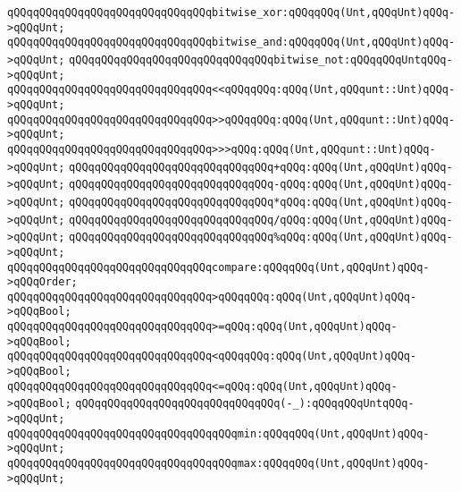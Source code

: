 \verb|qQQqqQQqqQQqqQQqqQQqqQQqqQQqqQQqbitwise_xor:qQQqqQQq(Unt,qQQqUnt)qQQq->qQQqUnt;|\newline
\verb|qQQqqQQqqQQqqQQqqQQqqQQqqQQqqQQqbitwise_and:qQQqqQQq(Unt,qQQqUnt)qQQq->qQQqUnt;|\newline
\verb|qQQqqQQqqQQqqQQqqQQqqQQqqQQqqQQqbitwise_not:qQQqqQQqUntqQQq->qQQqUnt;|\newline
\newline
\verb|qQQqqQQqqQQqqQQqqQQqqQQqqQQqqQQq<<qQQqqQQq:qQQq(Unt,qQQqunt::Unt)qQQq->qQQqUnt;|\newline
\verb|qQQqqQQqqQQqqQQqqQQqqQQqqQQqqQQq>>qQQqqQQq:qQQq(Unt,qQQqunt::Unt)qQQq->qQQqUnt;|\newline
\verb|qQQqqQQqqQQqqQQqqQQqqQQqqQQqqQQq>>>qQQq:qQQq(Unt,qQQqunt::Unt)qQQq->qQQqUnt;|\newline
\newline
\verb|qQQqqQQqqQQqqQQqqQQqqQQqqQQqqQQq+qQQq:qQQq(Unt,qQQqUnt)qQQq->qQQqUnt;|\newline
\verb|qQQqqQQqqQQqqQQqqQQqqQQqqQQqqQQq-qQQq:qQQq(Unt,qQQqUnt)qQQq->qQQqUnt;|\newline
\verb|qQQqqQQqqQQqqQQqqQQqqQQqqQQqqQQq*qQQq:qQQq(Unt,qQQqUnt)qQQq->qQQqUnt;|\newline
\verb|qQQqqQQqqQQqqQQqqQQqqQQqqQQqqQQq/qQQq:qQQq(Unt,qQQqUnt)qQQq->qQQqUnt;|\newline
\verb|qQQqqQQqqQQqqQQqqQQqqQQqqQQqqQQq%qQQq:qQQq(Unt,qQQqUnt)qQQq->qQQqUnt;|\newline
\newline
\verb|qQQqqQQqqQQqqQQqqQQqqQQqqQQqqQQqcompare:qQQqqQQq(Unt,qQQqUnt)qQQq->qQQqOrder;|\newline
\newline
\verb|qQQqqQQqqQQqqQQqqQQqqQQqqQQqqQQq>qQQqqQQq:qQQq(Unt,qQQqUnt)qQQq->qQQqBool;|\newline
\verb|qQQqqQQqqQQqqQQqqQQqqQQqqQQqqQQq>=qQQq:qQQq(Unt,qQQqUnt)qQQq->qQQqBool;|\newline
\verb|qQQqqQQqqQQqqQQqqQQqqQQqqQQqqQQq<qQQqqQQq:qQQq(Unt,qQQqUnt)qQQq->qQQqBool;|\newline
\verb|qQQqqQQqqQQqqQQqqQQqqQQqqQQqqQQq<=qQQq:qQQq(Unt,qQQqUnt)qQQq->qQQqBool;|\newline
\newline
\verb|qQQqqQQqqQQqqQQqqQQqqQQqqQQqqQQq(-_):qQQqqQQqUntqQQq->qQQqUnt;|\newline
\verb|qQQqqQQqqQQqqQQqqQQqqQQqqQQqqQQqqQQqmin:qQQqqQQq(Unt,qQQqUnt)qQQq->qQQqUnt;|\newline
\verb|qQQqqQQqqQQqqQQqqQQqqQQqqQQqqQQqqQQqmax:qQQqqQQq(Unt,qQQqUnt)qQQq->qQQqUnt;|\newline
